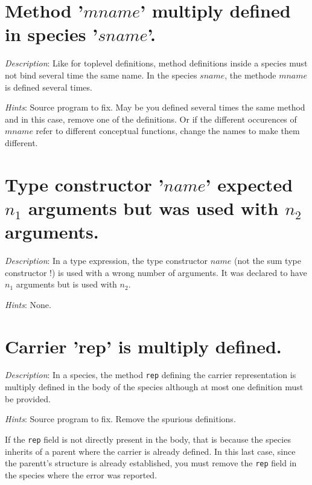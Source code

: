 \section*{Method '$mname$' multiply defined in species '$sname$'.}

{\em Description}: Like for toplevel definitions, method definitions
inside a species must not bind several time the same name. In the
species $sname$, the methode $mname$ is defined several times.

{\em Hints}: Source program to fix. May be you defined several times
the same method and in this case, remove one of the definitions. Or if
the different occurences of $mname$ refer to different conceptual
functions, change the names to make them different.



\section*{Type constructor '$name$' expected $n_1$ arguments but was
  used with $n_2$ arguments.}

{\em Description}: In a type expression, the type constructor $name$
(not the sum type constructor !) is used with a wrong number of
arguments. It was declared to have $n_1$ arguments but is used with
$n_2$.

{\em Hints}: None.



\section*{Carrier 'rep' is multiply defined.}

{\em Description}: In a species, the method {\tt rep} defining the
carrier representation is multiply defined in the body of the species
although at most one definition must be provided.

{\em Hints}: Source program to fix. Remove the spurious definitions.

If the {\tt rep} field is not directly present in the
body, that is because the species inherits of a parent where the
carrier is already defined. In this last case, since the parentt's
structure is already established, you must remove the {\tt rep} field
in the species where the error was reported.




